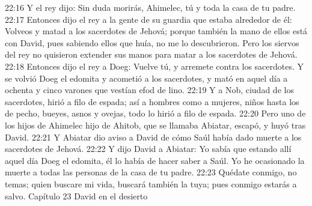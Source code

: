 22:16 Y el rey dijo: Sin duda morirás, Ahimelec, tú y toda la casa de tu padre.  
22:17 Entonces dijo el rey a la gente de su guardia que estaba alrededor de él: Volveos y matad a los sacerdotes de Jehová; porque también la mano de ellos está con David, pues sabiendo ellos que huía, no me lo descubrieron. Pero los siervos del rey no quisieron extender sus manos para matar a los sacerdotes de Jehová.  
22:18 Entonces dijo el rey a Doeg: Vuelve tú, y arremete contra los sacerdotes. Y se volvió Doeg el edomita y acometió a los sacerdotes, y mató en aquel día a ochenta y cinco varones que vestían efod de lino.  
22:19 Y a Nob, ciudad de los sacerdotes, hirió a filo de espada; así a hombres como a mujeres, niños hasta los de pecho, bueyes, asnos y ovejas, todo lo hirió a filo de espada.  
22:20 Pero uno de los hijos de Ahimelec hijo de Ahitob, que se llamaba Abiatar, escapó, y huyó tras David.  
22:21 Y Abiatar dio aviso a David de cómo Saúl había dado muerte a los sacerdotes de Jehová.  
22:22 Y dijo David a Abiatar: Yo sabía que estando allí aquel día Doeg el edomita, él lo había de hacer saber a Saúl. Yo he ocasionado la muerte a todas las personas de la casa de tu padre.  
22:23 Quédate conmigo, no temas; quien buscare mi vida, buscará también la tuya; pues conmigo estarás a salvo.  
Capítulo 23
David en el desierto  

